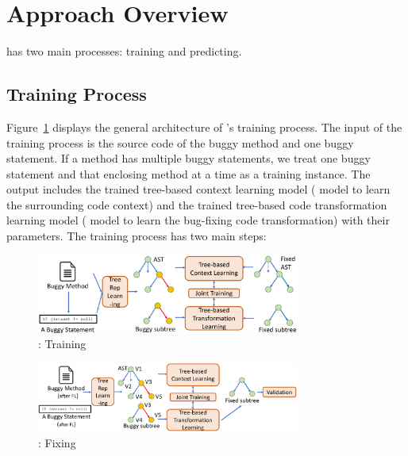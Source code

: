 \section{Approach Overview}
\label{overview:sec}

{\tool} has two main processes: training and predicting.

\subsection{Training Process}

Figure~\ref{overview-training} displays the general architecture of
{\tool}'s training process. The input of the training process is the
source code of the buggy method and one buggy statement. If a method
has multiple buggy statements, we treat one buggy statement and that
enclosing method at a time as a training instance. The output includes
the trained tree-based context learning model ( model to
learn the surrounding code context) and the trained tree-based code
transformation learning model ( model to learn the
bug-fixing code transformation) with their parameters. The training
process has two main steps:

\begin{figure}[t]
	\centering
	\includegraphics[width=3.4in]{graphs/overview-training.png}
	\caption{{\tool}: Training}
	\label{overview-training}
\end{figure}

\noindent 



\begin{figure}[t]
	\centering
	\includegraphics[width=3.4in]{graphs/overview-predict.png}
	\caption{{\tool}: Fixing}
	\label{overview-fixing}
\end{figure}

